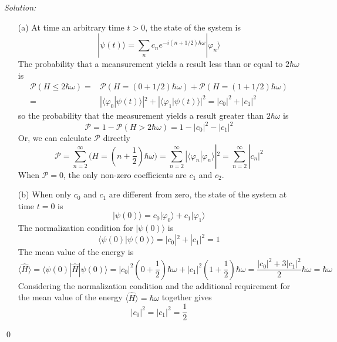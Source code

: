 \documentclass[12pt,a4paper]{article}
\newenvironment{sol}
    {\emph{Solution:}
    }
    {
    \qed
    }
\begin{document}
\begin{sol}
\begin{itemize}
\item[(a)] At time an arbitrary time $t>0$, the state of the system is
\begin{equation}
|\psi(t)\rangle=\sum_nc_ne^{-i(n+1/2)\hbar\omega}|\varphi_n\rangle
\end{equation}
The probability that a meansurement yields a result less than or equal to $2\hbar\omega$ is
\begin{align}
\nonumber\mathcal{P}(H\leq2\hbar\omega)=&\mathcal{P}(H=(0+1/2)\hbar\omega)+\mathcal{P}(H=(1+1/2)\hbar\omega)\\
=&|\langle\varphi_0|\psi(t)\rangle|^2+|\langle\varphi_1|\psi(t)\rangle|^2=|c_0|^2+|c_1|^2
\end{align}
so the probability that the measurement yields a result greater than $2\hbar\omega$ is
\begin{equation}
\mathcal{P}=1-\mathcal{P}(H>2\hbar\omega)=1-|c_0|^2-|c_1|^2
\end{equation}
Or, we can calculate $\mathcal{P}$ directly
\begin{equation}
\mathcal{P}=\sum_{n=2}^{\infty}\mathcal(H=(n+\frac{1}{2})\hbar\omega)=\sum_{n=2}^{\infty}|\langle\varphi_n|\varphi_n\rangle|^2=\sum_{n=2}^{\infty}|c_n|^2
\end{equation}
When $\mathcal{P}=0$, the only non-zero coefficients are $c_1$ and $c_2$.
\item[(b)] When only $c_0$ and $c_1$ are different from zero, the state of the system at time $t=0$ is
\begin{equation}
|\psi(0)\rangle=c_0|\varphi_0\rangle+c_1|\varphi_1\rangle
\end{equation}
The normalization condition for $|\psi(0)\rangle$ is
\begin{equation}
\langle\psi(0)|\psi(0)\rangle=|c_0|^2+|c_1|^2=1
\end{equation}
The mean value of the energy is
\begin{equation}
\langle\hat{H}\rangle=\langle\psi(0)|\hat{H}|\psi(0)\rangle=|c_0|^2(0+\frac{1}{2})\hbar\omega+|c_1|^2(1+\frac{1}{2})\hbar\omega=\frac{|c_0|^2+3|c_1|^2}{2}\hbar\omega=\hbar\omega
\end{equation}
Considering the normalization condition and the additional requirement for the mean value of the energy $\langle\hat{H}\rangle=\hbar\omega$ together gives
\begin{equation}
|c_0|^2=|c_1|^2=\frac{1}{2}
\end{equation}

\end{itemize}
\end{sol}
\end{document}
